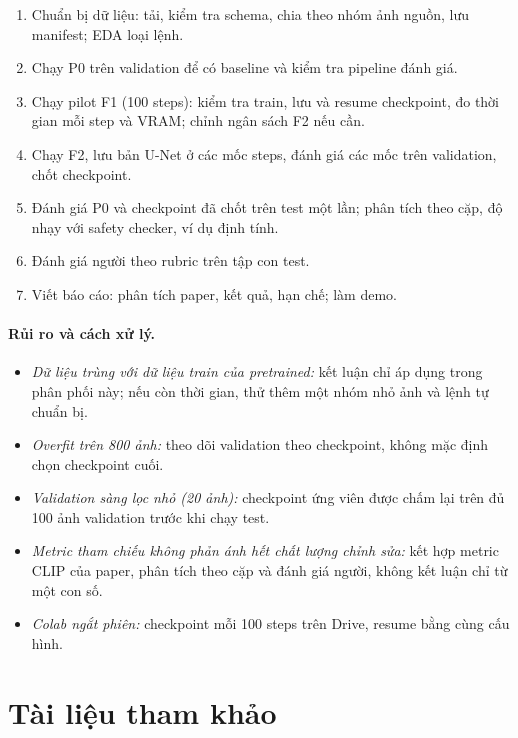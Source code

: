 \documentclass[12pt,a4paper]{article}
\begin{document}
\begin{enumerate}
\item Chuẩn bị dữ liệu: tải, kiểm tra schema, chia theo nhóm ảnh nguồn, lưu manifest;
EDA loại lệnh.
\item Chạy P0 trên validation để có baseline và kiểm tra pipeline đánh giá.
\item Chạy pilot F1 (100 steps): kiểm tra train, lưu và resume checkpoint, đo thời
gian mỗi step và VRAM; chỉnh ngân sách F2 nếu cần.
\item Chạy F2, lưu bản U-Net ở các mốc steps, đánh giá các mốc trên validation, chốt
checkpoint.
\item Đánh giá P0 và checkpoint đã chốt trên test một lần; phân tích theo cặp, độ nhạy
với safety checker, ví dụ định tính.
\item Đánh giá người theo rubric trên tập con test.
\item Viết báo cáo: phân tích paper, kết quả, hạn chế; làm demo.
\end{enumerate}

\paragraph{Rủi ro và cách xử lý.}
\begin{itemize}
\item \emph{Dữ liệu trùng với dữ liệu train của pretrained:} kết luận chỉ áp dụng
trong phân phối này; nếu còn thời gian, thử thêm một nhóm nhỏ ảnh và lệnh tự chuẩn bị.
\item \emph{Overfit trên 800 ảnh:} theo dõi validation theo checkpoint, không mặc định
chọn checkpoint cuối.
\item \emph{Validation sàng lọc nhỏ (20 ảnh):} checkpoint ứng viên được chấm lại trên
đủ 100 ảnh validation trước khi chạy test.
\item \emph{Metric tham chiếu không phản ánh hết chất lượng chỉnh sửa:} kết hợp metric
CLIP của paper, phân tích theo cặp và đánh giá người, không kết luận chỉ từ một con
số.
\item \emph{Colab ngắt phiên:} checkpoint mỗi 100 steps trên Drive, resume bằng cùng
cấu hình.
\end{itemize}

\section*{Tài liệu tham khảo}
\end{document}

